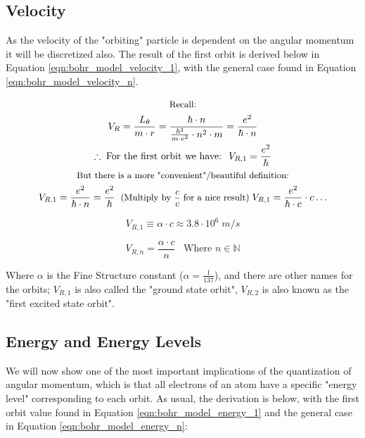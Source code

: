 \documentclass[../../Quantum-Technologies-Notes]{subfiles}
\begin{document}
			
		\subsection{Velocity}
			As the velocity of the "orbiting" particle is dependent on the angular momentum it will be discretized also. The result of the first orbit is derived below in Equation \ref{eqn:bohr_model_velocity_1}, with the general case found in Equation \ref{eqn:bohr_model_velocity_n}.
			
			\begin{gather*}
					\text{\small Recall:} \\
					V_R = \frac{L_\theta}{m  \cdot  r} = \frac{\hbar \cdot n}{\frac{\hbar^2}{m \cdot e^2} \cdot n^2 \cdot m} = \frac{e^2}{\hbar \cdot n} \\
					\therefore \; \text{For the first orbit we have: } \; V_{R,1} = \frac{e^2}{\hbar} \\
					\text{\small But there is a more "convenient"/beautiful definition:} \\
					V_{R,1} = \frac{e^2}{\hbar \cdot n} = \frac{e^2}{\hbar} \; \; \text{\small (Multiply by $\frac{c}{c}$ for a nice result)} \; V_{R,1} = \frac{e^2}{\hbar \cdot c} \cdot c \dots
				\end{gather*}
			
			\begin{equation} \label{eqn:bohr_model_velocity_1}
					V_{R,1} \equiv \alpha \cdot c \approx 3.8 \cdot 10^6 \; m/s
				\end{equation}
			
			\begin{equation} \label{eqn:bohr_model_velocity_n}
					V_{R,n} = \frac{\alpha \cdot c}{n} \; \; \; \text{Where } n \in \mathbb{N}
				\end{equation}
			
			
			Where $\alpha$ is the Fine Structure constant ($\alpha = \frac{1}{137}$), and there are other names for the orbits; $V_{R,1}$ is also called the "ground state orbit", $V_{R,2}$ is also known as the "first excited state orbit". \linebreak
			
			\pagebreak
			
			
		\subsection{Energy and Energy Levels}
			We will now show one of the most important implications of the quantization of angular momentum, which is that all electrons of an atom have a specific "energy level" corresponding to each orbit. As usual, the derivation is below, with the first orbit value found in Equation \ref{eqn:bohr_model_energy_1} and the general case in Equation \ref{eqn:bohr_model_energy_n}:
			
\end{document}
